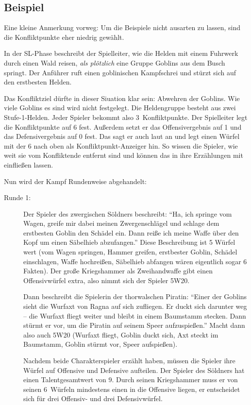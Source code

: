 \subsection{Beispiel}
Eine kleine Anmerkung vorweg: Um die Beispiele nicht ausarten zu lassen, sind die Konfliktpunkte eher niedrig gewählt.

\begin{beispiel}
In der SL-Phase beschreibt der Spielleiter, wie die Helden mit einem Fuhrwerk durch einen Wald reisen, \emph{als plötzlich} eine Gruppe Goblins aus dem Busch springt. Der Anführer ruft einen goblinischen Kampfschrei und stürzt sich auf den erstbesten Helden.

Das Konfliktziel dürfte in dieser Siuation klar sein: Abwehren der Goblins. Wie viele Goblins es sind wird nicht festgelegt. Die Heldengruppe besteht aus zwei Stufe-1-Helden. Jeder Spieler bekommt also 3~Konfliktpunkte. Der Spielleiter legt die Konfliktpunkte auf 6 fest. Außerdem setzt er das Offensivergebnis auf 1 und das Defensivergebnis auf 0 fest. Das sagt er auch laut an und legt einen Würfel mit der 6 nach oben als Konfliktpunkt-Anzeiger hin. So wissen die Spieler, wie weit sie vom Konfliktende entfernt sind und können das in ihre Erzählungen mit einfließen lassen.

Nun wird der Kampf Rundenweise abgehandelt:

\begin{description}
\item[Runde 1:] Der Spieler des zwergischen Söldners beschreibt: ``Ha, ich springe vom Wagen, greife mir dabei meinen Zwergenschlägel und schlage dem erstbesten Goblin den Schädel ein. Dann reiße ich meine Waffe über den Kopf um einen Säbelhieb abzufangen.'' Diese Beschreibung ist 5 Würfel wert (vom Wagen springen, Hammer greifen, erstbester Goblin, Schädel einschlagen, Waffe hochreißen, Säbelhieb abfangen wären eigentlich sogar 6 Fakten). Der große Kriegshammer als Zweihandwaffe gibt einen Offensivwürfel extra, also nimmt sich der Spieler 5W20.

Dann beschreibt die Spielerin der thorwalschen Piratin: ``Einer der Goblins sieht die Wurfaxt von Ragna auf sich zufliegen. Er duckt sich darunter weg -- die Wurfaxt fliegt weiter und bleibt in einem Baumstamm stecken. Dann stürmt er vor, um die Piratin auf seinem Speer aufzuspießen.'' Macht dann also auch 5W20 (Wurfaxt fliegt, Goblin duckt sich, Axt steckt im Baumstamm, Goblin stürmt vor, Speer aufspießen).

Nachdem beide Charakterspieler erzählt haben, müssen die Spieler ihre Würfel auf Offensive und Defensive aufteilen. Der Spieler des Söldners hat einen Talentgesamtwert von 9. Durch seinen Kriegshammer muss er von seinen 6~Würfeln mindestens einen in die Offensive liegen, er entscheidet sich für drei Offensiv- und drei Defensivwürfel.


\end{description}
\end{beispiel}
